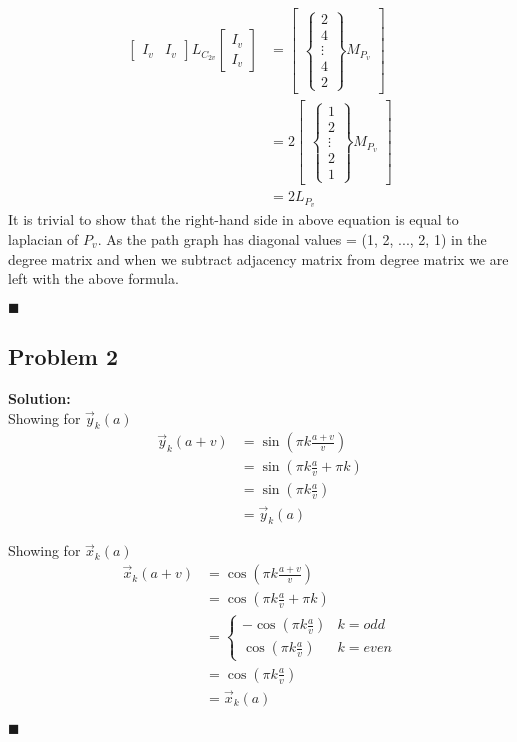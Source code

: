 \documentclass[12pt,a4paper]{article}
\newcommand{\rightqed}{
\begin{flushright}
$\blacksquare$
\end{flushright}
}
\newcommand{\solution}{\noindent\textbf{Solution:}\\\indent}
\begin{document}
\begin{align*}
\begin{bmatrix}I_v & I_v \end{bmatrix}L_{C_{2v}}\begin{bmatrix}I_v \\ I_v\end{bmatrix} &= \begin{bmatrix}
    \begin{Bmatrix}
    2 \\ 4 \\ \vdots \\ 4 \\ 2
    \end{Bmatrix}M_{P_v}
    \end{bmatrix} \\
    &= 2 \begin{bmatrix}\begin{Bmatrix}
    1 \\ 2 \\ \vdots \\ 2 \\ 1
    \end{Bmatrix}M_{P_v}\end{bmatrix} \\
    &= 2L_{P_v}
\end{align*}
It is trivial to show that the right-hand side in above equation is equal to laplacian of $P_v$. As the path graph has diagonal values = (1, 2, ..., 2, 1) in the degree matrix and when we subtract adjacency matrix from degree matrix we are left with the above formula.
\rightqed

\newpage
\subsection*{Problem 2}
\solution
Showing for $\vec{y}_k(a)$
\begin{align*}
    \vec{y}_k(a+v) &= \sin(\pi k\frac{a+v}{v}) \\
                   &= \sin(\pi k\frac{a}{v} + \pi k) \\
                   &= \sin(\pi k\frac{a}{v}) \\
                   &= \vec{y}_k(a)
\end{align*}

Showing for $\vec{x}_k(a)$
\begin{align*}
    \vec{x}_k(a+v) &= \cos(\pi k\frac{a+v}{v}) \\
                   &= \cos(\pi k\frac{a}{v} + \pi k) \\
                   &= \begin{cases}
                   -\cos(\pi k\frac{a}{v}) & k=odd \\
                   \cos(\pi k\frac{a}{v}) & k=even
                   \end{cases} \\
                   &= \cos(\pi k\frac{a}{v}) \\
                   &= \vec{x}_k(a)
\end{align*}
\rightqed
\end{document}

